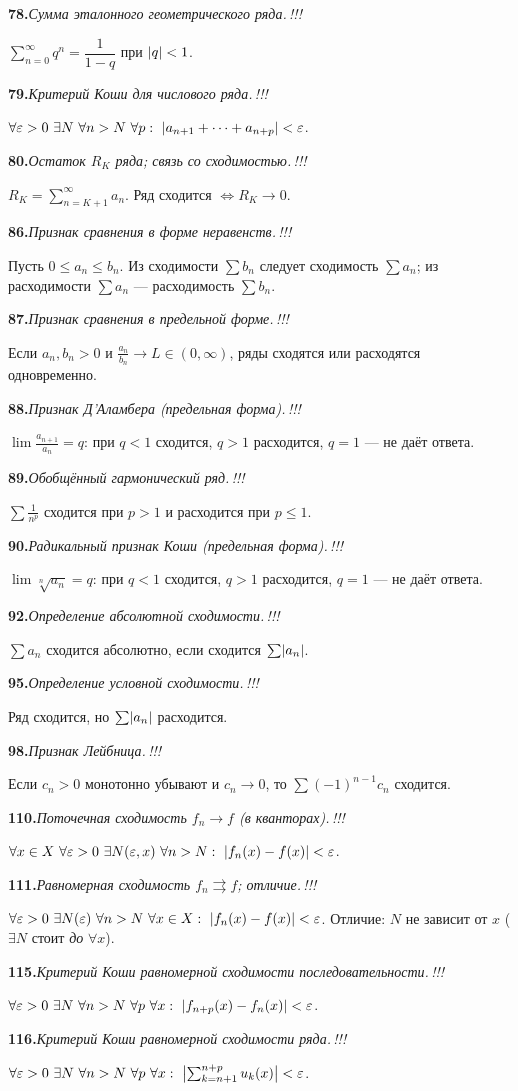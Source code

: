 \documentclass[10pt,a4paper]{article}
\newcommand{\eps}{\varepsilon}
\renewcommand{\le}{\leqslant}
\DeclarePairedDelimiter{\abs}{\lvert}{\rvert}
\theoremstyle{definition}
\theoremstyle{plain}
\newcommand{\writespace}{\vspace{7.5mm}}
\newcommand{\tm}{\textcolor{teormin}{\,!!!}}
\newcommand{\faq}[3]{%
  \par\smallskip\noindent
  \textbf{#1.}\enspace\textit{#2}\par
  \nobreak\vspace{0.3ex}\noindent #3\par
  \writespace}
\begin{document}
\faq{78}{Сумма эталонного геометрического ряда.\tm}{%
$\sum_{n=0}^\infty q^n=\dfrac1{1-q}$ при $\abs q<1$.}

\faq{79}{Критерий Коши для числового ряда.\tm}{%
$\forall\eps>0\ \exists N\ \forall n>N\ \forall p:\ \abs{a_{n+1}+\dots+a_{n+p}}<\eps$.}

\faq{80}{Остаток $R_K$ ряда; связь со сходимостью.\tm}{%
$R_K=\sum_{n=K+1}^\infty a_n$. Ряд сходится $\iff R_K\to0$.}

\faq{86}{Признак сравнения в форме неравенств.\tm}{%
Пусть $0\le a_n\le b_n$. Из сходимости $\sum b_n$ следует сходимость $\sum a_n$; из расходимости
$\sum a_n$ — расходимость $\sum b_n$.}

\faq{87}{Признак сравнения в предельной форме.\tm}{%
Если $a_n,b_n>0$ и $\frac{a_n}{b_n}\to L\in(0,\infty)$, ряды сходятся или расходятся одновременно.}

\faq{88}{Признак Д'Аламбера (предельная форма).\tm}{%
$\lim\frac{a_{n+1}}{a_n}=q$: при $q<1$ сходится, $q>1$ расходится, $q=1$ — не даёт ответа.}

\faq{89}{Обобщённый гармонический ряд.\tm}{%
$\sum\frac1{n^p}$ сходится при $p>1$ и расходится при $p\le1$.}

\faq{90}{Радикальный признак Коши (предельная форма).\tm}{%
$\lim\sqrt[n]{a_n}=q$: при $q<1$ сходится, $q>1$ расходится, $q=1$ — не даёт ответа.}

\faq{92}{Определение абсолютной сходимости.\tm}{%
$\sum a_n$ сходится абсолютно, если сходится $\sum\abs{a_n}$.}

\faq{95}{Определение условной сходимости.\tm}{%
Ряд сходится, но $\sum\abs{a_n}$ расходится.}

\faq{98}{Признак Лейбница.\tm}{%
Если $c_n>0$ монотонно убывают и $c_n\to0$, то $\sum(-1)^{n-1}c_n$ сходится.}

\faq{110}{Поточечная сходимость $f_n\to f$ (в кванторах).\tm}{%
$\forall x\in X\ \forall\eps>0\ \exists N(\eps,x)\ \forall n>N:\ \abs{f_n(x)-f(x)}<\eps$.}

\faq{111}{Равномерная сходимость $f_n\rightrightarrows f$; отличие.\tm}{%
$\forall\eps>0\ \exists N(\eps)\ \forall n>N\ \forall x\in X:\ \abs{f_n(x)-f(x)}<\eps$. Отличие:
$N$ не зависит от $x$ ($\exists N$ стоит \emph{до} $\forall x$).}

\faq{115}{Критерий Коши равномерной сходимости последовательности.\tm}{%
$\forall\eps>0\ \exists N\ \forall n>N\ \forall p\ \forall x:\ \abs{f_{n+p}(x)-f_n(x)}<\eps$.}

\faq{116}{Критерий Коши равномерной сходимости ряда.\tm}{%
$\forall\eps>0\ \exists N\ \forall n>N\ \forall p\ \forall x:\
\abs[\big]{\sum_{k=n+1}^{n+p}u_k(x)}<\eps$.}
\end{document}

